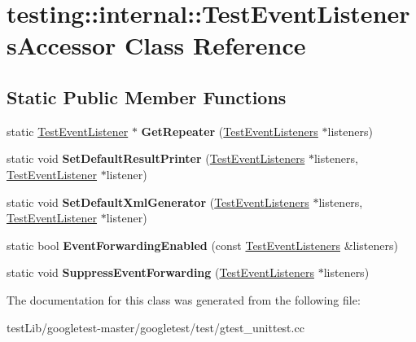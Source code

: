\hypertarget{classtesting_1_1internal_1_1TestEventListenersAccessor}{}\section{testing\+:\+:internal\+:\+:Test\+Event\+Listeners\+Accessor Class Reference}
\label{classtesting_1_1internal_1_1TestEventListenersAccessor}
\subsection*{Static Public Member Functions}
\begin{DoxyCompactItemize}
\item 
\mbox{\label{classtesting_1_1internal_1_1TestEventListenersAccessor_a07c6f8644e509d0f23c0c16a60856387}} 
static \hyperlink{classtesting_1_1TestEventListener}{Test\+Event\+Listener} $\ast$ {\bfseries Get\+Repeater} (\hyperlink{classtesting_1_1TestEventListeners}{Test\+Event\+Listeners} $\ast$listeners)
\item 
\mbox{\label{classtesting_1_1internal_1_1TestEventListenersAccessor_ac8886c7cea5a4ad39aed276d3f58da75}} 
static void {\bfseries Set\+Default\+Result\+Printer} (\hyperlink{classtesting_1_1TestEventListeners}{Test\+Event\+Listeners} $\ast$listeners, \hyperlink{classtesting_1_1TestEventListener}{Test\+Event\+Listener} $\ast$listener)
\item 
\mbox{\label{classtesting_1_1internal_1_1TestEventListenersAccessor_a8c04463b5ba5ee6d6da36e2171c7fff0}} 
static void {\bfseries Set\+Default\+Xml\+Generator} (\hyperlink{classtesting_1_1TestEventListeners}{Test\+Event\+Listeners} $\ast$listeners, \hyperlink{classtesting_1_1TestEventListener}{Test\+Event\+Listener} $\ast$listener)
\item 
\mbox{\label{classtesting_1_1internal_1_1TestEventListenersAccessor_a4a7522557045cb55eb037dc61429d71c}} 
static bool {\bfseries Event\+Forwarding\+Enabled} (const \hyperlink{classtesting_1_1TestEventListeners}{Test\+Event\+Listeners} \&listeners)
\item 
\mbox{\label{classtesting_1_1internal_1_1TestEventListenersAccessor_abfc0a0f8163465f4f5d42436ec8c7cb3}} 
static void {\bfseries Suppress\+Event\+Forwarding} (\hyperlink{classtesting_1_1TestEventListeners}{Test\+Event\+Listeners} $\ast$listeners)
\end{DoxyCompactItemize}


The documentation for this class was generated from the following file\+:\begin{DoxyCompactItemize}
\item 
test\+Lib/googletest-\/master/googletest/test/gtest\+\_\+unittest.\+cc\end{DoxyCompactItemize}
